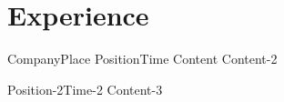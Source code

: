 \section{Experience}
	\HeadingItemListStart
		\HeadingItem
			{Company}{Place}
			{Position}{Time}
			\ItemListStart
					{Content}
					{Content-2}
			\ItemListEnd
			
		\SubHeadingItem
			{Position-2}{Time-2}
			\ItemListStart
					{Content-3}
			\ItemListEnd
	\HeadingItemListEnd
